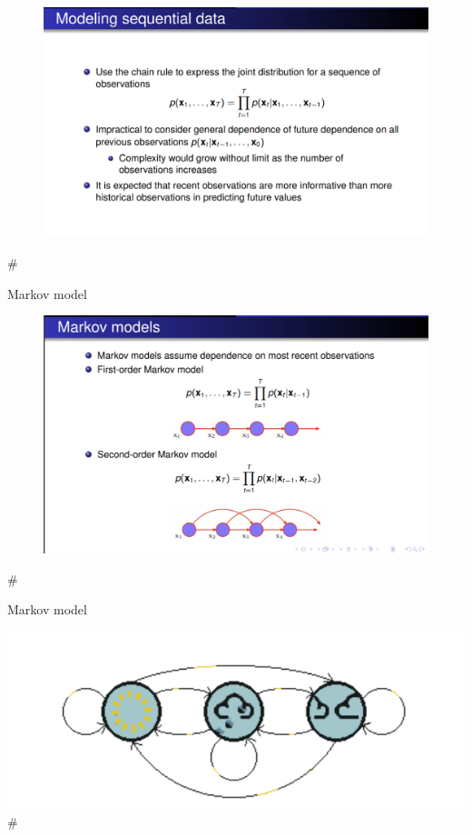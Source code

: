 \documentclass[11pt]{article}
\makeatletter
\def\maxwidth{\ifdim\Gin@nat@width>\linewidth\linewidth
    \else\Gin@nat@width\fi}
\let\Oldincludegraphics\includegraphics
\renewcommand{\includegraphics}[1]{\Oldincludegraphics[width=.8\maxwidth]{#1}}
\makeatother
\begin{document}
    \begin{figure}
\centering
\includegraphics{model_sequence.png}
\caption{}
\end{figure}

    \#

Markov model

\begin{figure}
\centering
\includegraphics{markov.png}
\caption{}
\end{figure}

    \#

Markov model

\includegraphics{weather.png} \#
\end{document}
